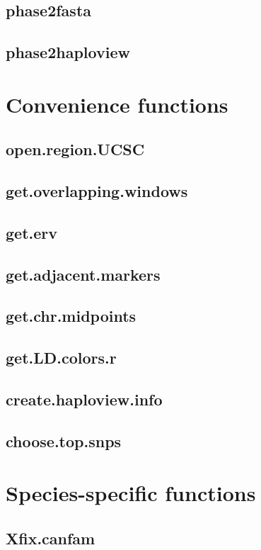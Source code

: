 \documentclass[12pt,a4paper,oneside]{article}\usepackage[]{graphicx}\usepackage[]{color}
\begin{document}
\subsection*{phase2fasta}
\subsection*{phase2haploview}

\section*{Convenience functions}
\subsection*{open.region.UCSC}
\subsection*{get.overlapping.windows}
\subsection*{get.erv}
\subsection*{get.adjacent.markers}
\subsection*{get.chr.midpoints}
\subsection*{get.LD.colors.r}
\subsection*{create.haploview.info}
\subsection*{choose.top.snps}

\section*{Species-specific functions}
\subsection*{Xfix.canfam}
\end{document}
